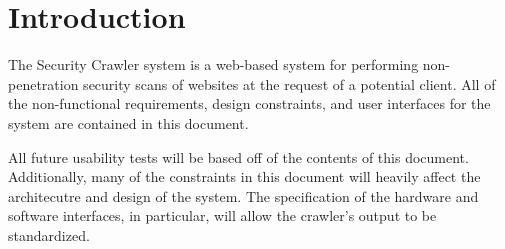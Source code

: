 \section{Introduction}
The Security Crawler system is a web-based system for performing non-penetration security scans of websites at the request of a potential client.  All of the non-functional requirements, design constraints, and user interfaces for the system are contained in this document.

All future usability tests will be based off of the contents of this document.  Additionally, many of the constraints in this document will heavily affect the architecutre and design of the system.  The specification of the hardware and software interfaces, in particular, will allow the crawler's output to be standardized.
